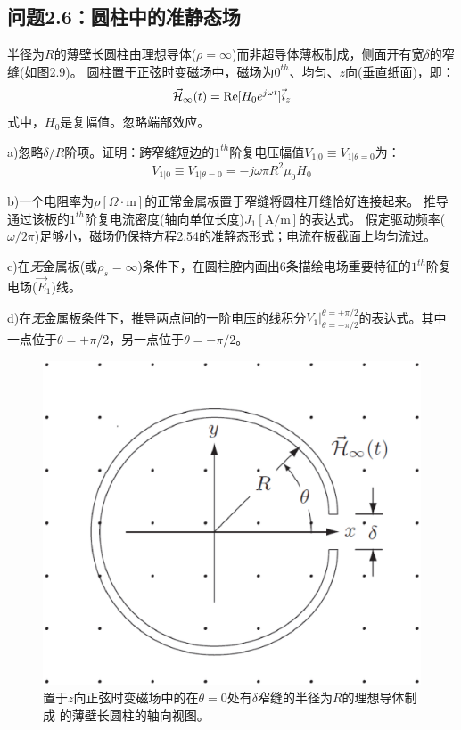 \subsection{问题2.6：圆柱中的准静态场}
半径为$R$的薄壁长圆柱由理想导体($\rho=\infty$)而非超导体薄板制成，侧面开有宽$\delta$的窄缝(如图2.9)。
圆柱置于正弦时变磁场中，磁场为$0^{th}$、均匀、$z$向(垂直纸面)，即：
\begin{equation}
\vec{\CMcal{H}}_\infty(t)=\mathrm{Re}[H_0 e^{j\omega t}] \vec{i}_z
\end{equation}
式中，$H_0$是复幅值。忽略端部效应。

a)忽略$\delta/R$阶项。证明：跨窄缝短边的$1^{th}$阶复电压幅值$V_{1|0}\equiv V_{1|\theta=0}$为：
\begin{equation}
V_{1|0}\equiv V_{1|\theta=0}=-j\omega \pi R^2 \mu_0 H_0
\end{equation}

b)一个电阻率为$\rho[\Omega\cdot\mathrm{m}]$的正常金属板置于窄缝将圆柱开缝恰好连接起来。
推导通过该板的$1^{th}$阶复电流密度(轴向单位长度)$J_1 [\mathrm{A/m}]$的表达式。
假定驱动频率($\omega/2\pi$)足够小，磁场仍保持方程2.54的准静态形式；电流在板截面上均匀流过。

c)在\textit{无}金属板(或$\rho_s=\infty$)条件下，在圆柱腔内画出6条描绘电场重要特征的$1^{th}$阶复电场($\vec{E}_1$)线。

d)在\textit{无}金属板条件下，推导两点间的一阶电压的线积分$V_1 |_{\theta=-\pi/2}^{\theta=+\pi/2}$的表达式。其中一点位于$\theta=+\pi/2$，另一点位于$\theta=-\pi/2$。

\begin{figure}[htbp]
  \centering
 \includegraphics[scale=0.4]{chpt2/figs/fig2.9.eps}
  \caption{置于$z$向正弦时变磁场中的在$\theta=0$处有$\delta$窄缝的半径为$R$的理想导体制成
  的薄壁长圆柱的轴向视图。}
\end{figure}

